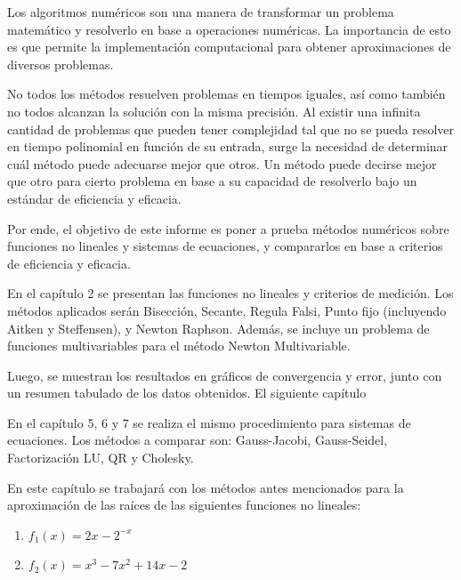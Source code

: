 \documentclass{memoria}
\begin{document}

\indices


Los algoritmos numéricos son una manera de transformar un problema matemático y resolverlo en base a operaciones numéricas. La importancia de esto es que permite la implementación computacional para obtener aproximaciones de diversos problemas.

No todos los métodos resuelven problemas en tiempos iguales, así como también no todos alcanzan la solución con la misma precisión. Al existir una infinita cantidad de problemas que pueden tener complejidad tal que no se pueda resolver en tiempo polinomial en función de su entrada, surge la necesidad de determinar cuál método puede adecuarse mejor que otros. Un método puede decirse mejor que otro para cierto problema en base a su capacidad de resolverlo bajo un estándar de eficiencia y eficacia.

Por ende, el objetivo de este informe es poner a prueba métodos numéricos sobre funciones no lineales y sistemas de ecuaciones, y compararlos en base a criterios de eficiencia y eficacia.

En el capítulo 2 se presentan las funciones no lineales y criterios de medición. Los métodos aplicados serán Bisección, Secante, Regula Falsi, Punto fijo (incluyendo Aitken y Steffensen), y Newton Raphson. Además, se incluye un problema de funciones multivariables para el método Newton Multivariable.

Luego, se muestran los resultados en gráficos de convergencia y error, junto con un resumen tabulado de los datos obtenidos. El siguiente capítulo 

En el capítulo 5, 6 y 7 se realiza el mismo procedimiento para sistemas de ecuaciones. Los métodos a comparar son: Gauss-Jacobi, Gauss-Seidel, Factorización LU, QR y Cholesky.


En este capítulo se trabajará con los métodos antes mencionados para la aproximación de las raíces de las siguientes funciones no lineales:


\begin{enumerate}
\item $f_{1}(x)=2x - 2^{-x}$
\item $f_{2}(x)=x^{3}-7x^{2}+14x-2$
\end{enumerate}
\end{document}
